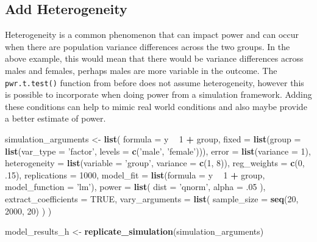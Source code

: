 \documentclass[man]{apa6}
\newenvironment{Shaded}{\begin{snugshade}}{\end{snugshade}}
\newcommand{\DataTypeTok}[1]{\textcolor[rgb]{0.13,0.29,0.53}{#1}}
\newcommand{\DecValTok}[1]{\textcolor[rgb]{0.00,0.00,0.81}{#1}}
\newcommand{\FloatTok}[1]{\textcolor[rgb]{0.00,0.00,0.81}{#1}}
\newcommand{\KeywordTok}[1]{\textcolor[rgb]{0.13,0.29,0.53}{\textbf{#1}}}
\newcommand{\NormalTok}[1]{#1}
\newcommand{\OperatorTok}[1]{\textcolor[rgb]{0.81,0.36,0.00}{\textbf{#1}}}
\newcommand{\OtherTok}[1]{\textcolor[rgb]{0.56,0.35,0.01}{#1}}
\newcommand{\StringTok}[1]{\textcolor[rgb]{0.31,0.60,0.02}{#1}}
\begin{document}
\hypertarget{add-heterogeneity}{%
\subsection{Add Heterogeneity}\label{add-heterogeneity}}

Heterogeneity is a common phenomenon that can impact power and can occur when there are population variance differences across the two groups. In the above example, this would mean that there would be variance differences across males and females, perhaps males are more variable in the outcome. The \texttt{pwr.t.test()} function from before does not assume heterogeneity, however this is possible to incorporate when doing power from a simulation framework. Adding these conditions can help to mimic real world conditions and also maybe provide a better estimate of power.

\begin{Shaded}
\begin{Highlighting}[]
\NormalTok{simulation_arguments <-}\StringTok{ }\KeywordTok{list}\NormalTok{(}
  \DataTypeTok{formula =}\NormalTok{ y }\OperatorTok{~}\StringTok{ }\DecValTok{1} \OperatorTok{+}\StringTok{ }\NormalTok{group,}
  \DataTypeTok{fixed =} \KeywordTok{list}\NormalTok{(}\DataTypeTok{group =} \KeywordTok{list}\NormalTok{(}\DataTypeTok{var_type =} \StringTok{'factor'}\NormalTok{, }
                            \DataTypeTok{levels =} \KeywordTok{c}\NormalTok{(}\StringTok{'male'}\NormalTok{, }\StringTok{'female'}\NormalTok{))),}
  \DataTypeTok{error =} \KeywordTok{list}\NormalTok{(}\DataTypeTok{variance =} \DecValTok{1}\NormalTok{),}
  \DataTypeTok{heterogeneity =} \KeywordTok{list}\NormalTok{(}\DataTypeTok{variable =} \StringTok{'group'}\NormalTok{,}
                       \DataTypeTok{variance =} \KeywordTok{c}\NormalTok{(}\DecValTok{1}\NormalTok{, }\DecValTok{8}\NormalTok{)),}
  \DataTypeTok{reg_weights =} \KeywordTok{c}\NormalTok{(}\DecValTok{0}\NormalTok{, }\FloatTok{.15}\NormalTok{),}
  \DataTypeTok{replications =} \DecValTok{1000}\NormalTok{,}
  \DataTypeTok{model_fit =} \KeywordTok{list}\NormalTok{(}\DataTypeTok{formula =}\NormalTok{ y }\OperatorTok{~}\StringTok{ }\DecValTok{1} \OperatorTok{+}\StringTok{ }\NormalTok{group, }
                   \DataTypeTok{model_function =} \StringTok{'lm'}\NormalTok{),}
  \DataTypeTok{power =} \KeywordTok{list}\NormalTok{(}
    \DataTypeTok{dist =} \StringTok{'qnorm'}\NormalTok{,}
    \DataTypeTok{alpha =} \FloatTok{.05}
\NormalTok{  ),}
  \DataTypeTok{extract_coefficients =} \OtherTok{TRUE}\NormalTok{,}
  \DataTypeTok{vary_arguments =} \KeywordTok{list}\NormalTok{(}
    \DataTypeTok{sample_size =} \KeywordTok{seq}\NormalTok{(}\DecValTok{20}\NormalTok{, }\DecValTok{2000}\NormalTok{, }\DecValTok{20}\NormalTok{) }
\NormalTok{  )}
\NormalTok{)}

\NormalTok{model_results_h <-}\StringTok{ }\KeywordTok{replicate_simulation}\NormalTok{(simulation_arguments)}
\end{Highlighting}
\end{Shaded}
\end{document}
